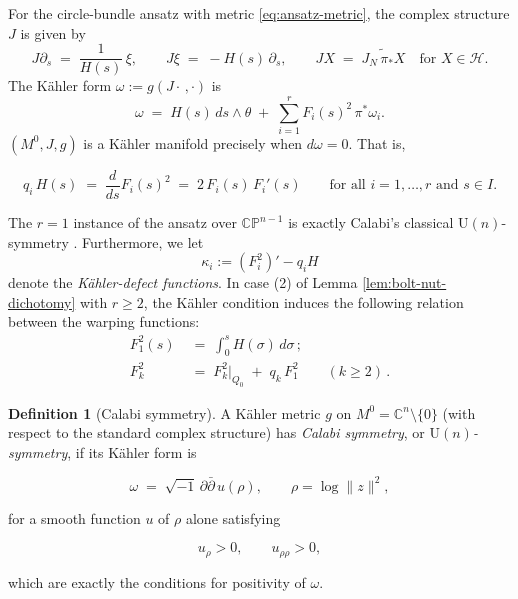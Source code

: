 \documentclass[11pt]{amsart}
\theoremstyle{plain}
\numberwithin{equation}{section}
\newtheorem{proposition}[theorem]{Proposition}
\theoremstyle{definition}
\newtheorem{definition}[theorem]{Definition}
\theoremstyle{remark}
\begin{document}
For the circle-bundle ansatz with metric \eqref{eq:ansatz-metric}, the complex structure $J$ is given by 
\[
J \partial_s \;=\; \frac{1}{H(s)}\, \xi, \qquad J \xi \;=\; -H(s)\, \partial_s, \qquad J X \;=\; \widetilde{J_N\, \pi_* X} \quad \text{for } X \in \mathcal{H}.
\]
The K\"{a}hler form $\omega := g(J \cdot\,, \cdot)$ is
\begin{equation}\label{eq:kahler-form}
	\omega \;=\; H(s)\, ds \wedge \theta \;+\; \sum_{i=1}^r F_i(s)^2\, \pi^* \omega_i.
\end{equation}
$(M^0, J, g)$ is a Kähler manifold precisely when $d\omega = 0$. That is, 


\begin{equation}\label{eq:kahler-condition}
	q_i\, H(s) \;=\; \frac{d}{ds} F_i(s)^2 \;=\; 2\, F_i(s)\, F_i'(s) \qquad \text{for all } i = 1, \dots, r \text{ and } s \in I.
\end{equation}

The $r = 1$ instance of the ansatz over $\mathbb{CP}^{n-1}$ is exactly Calabi's classical $\mathrm{U} ( n )$-symmetry \cite{Calabi}. Furthermore, we let \[\kappa_i := (F_i^2)' - q_i H\] denote the \emph{Kähler-defect functions}. In case (2) of Lemma \ref{lem:bolt-nut-dichotomy} with $r \geq 2$, the K\"{a}hler condition induces the following relation between the warping functions:
\begin{align}
	\label{eq:F1-int-H}
	F_1^2 ( s ) &\;=\; \int_0^s H ( \sigma )\, d\sigma \,;\\
	\label{eq:Fk-affine}
	F_k^2 &\;=\; F_k^2 \big|_{Q_0} \;+\; q_k\, F_1^2 \qquad ( k \geq 2 ) \,.
\end{align}

\iffalse
\begin{definition}[Calabi symmetry]\label{def:calabi-symmetry}
	A Kähler metric $g$ on $M^0 = \mathbb{C}^n \setminus \{0\}$ (with respect to the standard complex structure) has \emph{Calabi symmetry}, or $\mathrm{U}(n)$\emph{-symmetry}, if its Kähler form is
	
	\begin{equation}\label{eq:calabi-potential}
		\omega \;=\; \sqrt{-1}\, \partial \bar{\partial}\, u(\rho), \qquad \rho = \log \|z\|^2 ,
	\end{equation}
	
	for a smooth function $u$ of $\rho$ alone satisfying
	
	\[
	u_{\rho} > 0, \qquad u_{\rho\rho} > 0 ,
	\]
	
	which are exactly the conditions for positivity of $\omega$.
	
\end{definition}
\end{document}
